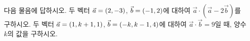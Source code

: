 다음 물음에 답하시오.
 두 벡터 $\vec{a}=(2{,}\mkern3mu\mathopen{}-3)$, $\vec{b}=(-1{,}\mkern3mu\mathopen{}2)$에 대하여 $\vec{a}\cdot(\vec{a}-2\vec{b})$를 구하시오.
 두 벡터 $\vec{a}=(1{,}\mkern3mu\mathopen{}k+1{,}\mkern3mu\mathopen{}1)$, $\vec{b}=(-k{,}\mkern3mu\mathopen{}k-1{,}\mkern3mu\mathopen{}4)$에 대하여 $\vec{a}\cdot\vec{b}=9$일 때, 양수 $k$의 값을 구하시오.
